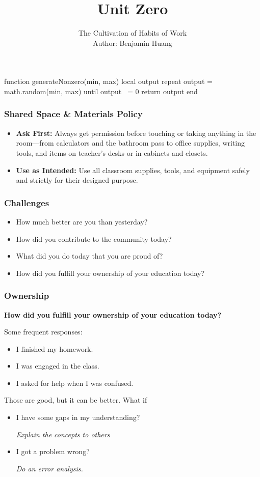 \documentclass[10pt, aspectratio=169]{beamer}
\author[B.H.]{{\Large The Cultivation of Habits of Work}\\\vspace{.5em} Author: Benjamin Huang}
\date{}
\title[U0]{Unit Zero}
\begin{document}
\begin{luacode*}
function generateNonzero(min, max)
  local output
  repeat
    output = math.random(min, max)
  until output ~= 0
  return output
end
\end{luacode*}
\frame{\titlepage}
\Large

\begin{frame}
\frametitle{Shared Space \& Materials Policy}
\begin{itemize}[label=$\bullet$]
\item
\textbf{Ask First:} Always get permission before touching or taking anything in the room—from calculators and the bathroom pass to office supplies, writing tools, and items on teacher's desks or in cabinets and closets.
\item
\textbf{Use as Intended:} Use all classroom supplies, tools, and equipment safely and strictly for their designed purpose.
\end{itemize}
\end{frame}

\begin{frame} \frametitle{Challenges} 
\begin{itemize} \item How much better are you than yesterday?  \item How did you contribute to the community today?  \item What did you do today that you are proud of?  \item How did you fulfill your ownership of your education today?\end{itemize} \end{frame}

\begin{frame}
\large
\frametitle{Ownership}
\begin{center}
\textbf{How did you fulfill your ownership of your education today?}
\pause
\end{center}
Some frequent responses:\pause
\begin{itemize}
\it 
\item I finished my homework.\pause
\item I was engaged in the class.\pause
\item I asked for help when I was confused.\pause
\end{itemize}
Those are good, but it can be better. \pause What if
\begin{itemize}
\item I have some gaps in my understanding?\pause
\begin{center}
\textit{Explain the concepts to others}\pause
\end{center}
\item I got a problem wrong?\pause
\begin{center}
\textit{Do an error analysis.}
\end{center}
\end{itemize}
\end{frame}
\end{document}
